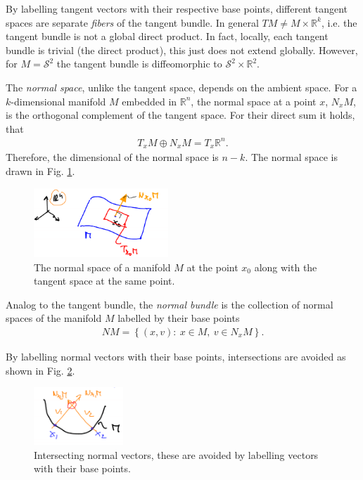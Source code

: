 By labelling tangent vectors with their respective base points, different tangent spaces are separate \emph{fibers} of the tangent bundle. In general $TM \neq M \times \mathbb{R}^{k}$, i.e. the tangent bundle is not a global direct product. In fact, locally, each tangent bundle is trivial (the direct product), this just does not extend globally. However, for $M=\mathcal{S}^{2}$ the tangent bundle is diffeomorphic to $\mathcal{S}^{2} \times \mathbb{R}^{2}$. 

\begin{definition}
	The \emph{normal space}, unlike the tangent space, depends on the ambient space. For a $k$-dimensional manifold $M$ embedded in $\mathbb{R}^{n}$, the normal space at a point $x$, $N_{x}M$, is the orthogonal complement of the tangent space. For their direct sum it holds, that 
	\begin{align}
		\boxed{
			T_{x}M \oplus N_{x}M = T_{x}\mathbb{R}^{n}.
		}
	\end{align}
	Therefore, the dimensional of the normal space is $n-k$. The normal space is drawn in Fig. \ref{fig:normal_space_def}.	
	\begin{figure}[h!]
		\centering
		\includegraphics[width=0.45\textwidth]{figures/ch9/8normal_space_def.png}
		\caption{The normal space of a manifold $M$ at the point $x_0$ along with the tangent space at the same point.}
		\label{fig:normal_space_def}
	\end{figure}
\end{definition}

\begin{definition}
	Analog to the tangent bundle, the \emph{normal bundle} is the collection of normal spaces of the manifold $M$ labelled by their base points
	\begin{align}
	\boxed{
		NM = \left\{ (x,v):\ x\in M,\ v\in N_{x}M \right\}.
	}
	\end{align}
\end{definition}
By labelling normal vectors with their base points, intersections are avoided as shown in Fig. \ref{fig:normal_vector_intersection}.
\begin{figure}[h!]
	\centering
	\includegraphics[width=0.3\textwidth]{figures/ch9/9normal_vector_intersection.png}
	\caption{Intersecting normal vectors, these are avoided by labelling vectors with their base points.}
	\label{fig:normal_vector_intersection}
\end{figure}

